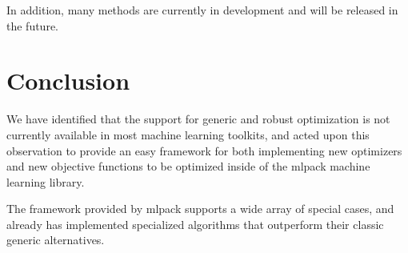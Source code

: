 \documentclass{article}
\begin{document}
In addition, many methods are currently in development and will be released in
the future.

\section{Conclusion}

We have identified that the support for generic and robust optimization is not
currently available in most machine learning toolkits, and acted upon this
observation to provide an easy framework for both implementing new optimizers
and new objective functions to be optimized inside of the mlpack machine
learning library.

The framework provided by mlpack supports a wide array of special cases, and
already has implemented specialized algorithms that outperform their classic
generic alternatives.



\end{document}
